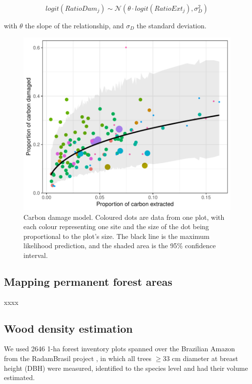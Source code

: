 \documentclass{article}
\begin{document}
\begin{equation}
logit(RatioDam_j) \sim \mathcal{N}(\theta \cdot logit(RatioExt_j), \sigma_D^2)
\end{equation} 

with $\theta$ the slope of the relationship, and $\sigma_D$ the standard deviation. 

\begin{figure}
    \centering
    \includegraphics[width=\linewidth]{graphs/damModel.pdf}
    \caption{Carbon damage model. Coloured dots are data from one plot, with each colour representing one site and the size of the dot being proportional to the plot's size. The black line is the maximum likelihood prediction, and the shaded area is the 95\% confidence interval.}
    \label{fig:damModel}
\end{figure}

\subsection{Mapping permanent forest areas}

xxxx


\subsection{Wood density estimation}
\label{supmat:wdext}

We used 2646 1-ha forest inventory plots spanned over the Brazilian Amazon from the RadamBrasil project \cite{Radam2017}, in which all trees $\geq$33 cm diameter at breast height (DBH) were measured, identified to the species level and had their volume estimated. 
\end{document}
